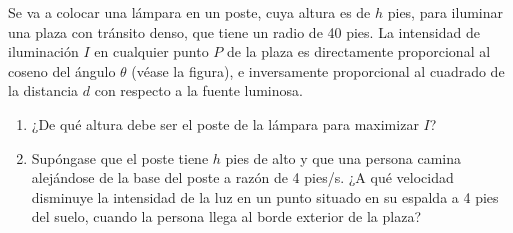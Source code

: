 \item Se va a colocar una lámpara en un poste, cuya altura es de $h$ pies, para iluminar una plaza con tránsito denso, que tiene un radio de 40 pies. La intensidad de iluminación $I$ en cualquier punto $P$ de la plaza es directamente proporcional al coseno del ángulo $\theta$ (véase la figura), e inversamente proporcional al cuadrado de la distancia $d$ con respecto a la fuente luminosa.
\begin{enumerate}
    \item[(a)] ¿De qué altura debe ser el poste de la lámpara para maximizar $I$?
    \item[(b)] Supóngase que el poste tiene $h$ pies de alto y que una persona camina alejándose de la base del poste a razón de 4 pies/s. ¿A qué velocidad disminuye la intensidad de la luz en un punto situado en su espalda a 4 pies del suelo, cuando la persona llega al borde exterior de la plaza?
\end{enumerate}
\begin{center}
\end{center}
